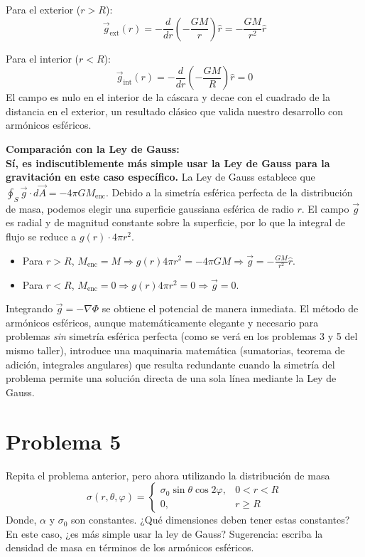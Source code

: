 \documentclass[a4paper]{article}
\begin{document}
Para el exterior ($r > R$):
$$
\vec{g}_{\text{ext}}(r) = -\frac{d}{dr} \left( -\frac{GM}{r} \right) \hat{r} = -\frac{GM}{r^2} \hat{r}
$$

Para el interior ($r < R$):
$$
\vec{g}_{\text{int}}(r) = -\frac{d}{dr} \left( -\frac{GM}{R} \right) \hat{r} = 0
$$
El campo es nulo en el interior de la cáscara y decae con el cuadrado de la distancia en el exterior, un resultado clásico que valida nuestro desarrollo con armónicos esféricos.

\textbf{Comparación con la Ley de Gauss:} \\
\textbf{Sí, es indiscutiblemente más simple usar la Ley de Gauss para la gravitación en este caso específico.} La Ley de Gauss establece que $\oint_S \vec{g} \cdot d\vec{A} = -4\pi G M_{\text{enc}}$. 
Debido a la simetría esférica perfecta de la distribución de masa, podemos elegir una superficie gaussiana esférica de radio $r$. El campo $\vec{g}$ es radial y de magnitud constante sobre la superficie, por lo que la integral de flujo se reduce a $g(r) \cdot 4\pi r^2$. 
\begin{itemize}
    \item Para $r > R$, $M_{\text{enc}} = M \Rightarrow g(r) 4\pi r^2 = -4\pi G M \Rightarrow \vec{g} = -\frac{GM}{r^2}\hat{r}$.
    \item Para $r < R$, $M_{\text{enc}} = 0 \Rightarrow g(r) 4\pi r^2 = 0 \Rightarrow \vec{g} = 0$.
\end{itemize}
Integrando $\vec{g} = -\nabla \Phi$ se obtiene el potencial de manera inmediata. El método de armónicos esféricos, aunque matemáticamente elegante y necesario para problemas \textit{sin} simetría esférica perfecta (como se verá en los problemas 3 y 5 del mismo taller), introduce una maquinaria matemática (sumatorias, teorema de adición, integrales angulares) que resulta redundante cuando la simetría del problema permite una solución directa de una sola línea mediante la Ley de Gauss.

\section{Problema 5}
Repita el problema anterior, pero ahora utilizando la distribución de masa
$$
\sigma(r, \theta, \varphi)= \begin{cases} 
\sigma_0 \sin \theta \cos 2\varphi, & 0 < r < R \\ 
0, & r \geq R 
\end{cases}
$$
Donde, $\alpha$ y $\sigma_0$ son constantes. ¿Qué dimensiones deben tener estas constantes? En este caso, ¿es más simple usar la ley de Gauss? Sugerencia: escriba la densidad de masa en términos de los armónicos esféricos.
\end{document}

